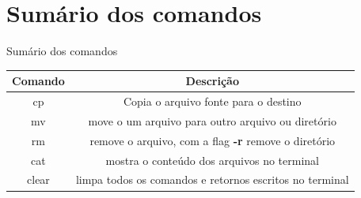 \documentclass{beamer}
\begin{document}
\section*{Sumário dos comandos}

\begin{frame}{Sumário dos comandos}
 \begin{center}
 \begin{tabular}{||c | c||} 
 \hline
 \textbf{Comando} & \textbf{Descri\c{c}ão}\\ [0.5ex] 
 \hline\hline
 cp & Copia o arquivo fonte para o destino\\ 
 \hline
 mv & move o um arquivo para outro arquivo ou diretório\\
 \hline
 rm & remove o arquivo, com a flag \textbf{-r} remove o diretório\\
 \hline
 cat & mostra o conteúdo dos arquivos no terminal \\
 \hline
 clear & limpa todos os comandos e retornos escritos no terminal\\
 \hline
\end{tabular}
\end{center}
\end{frame}
\end{document}
